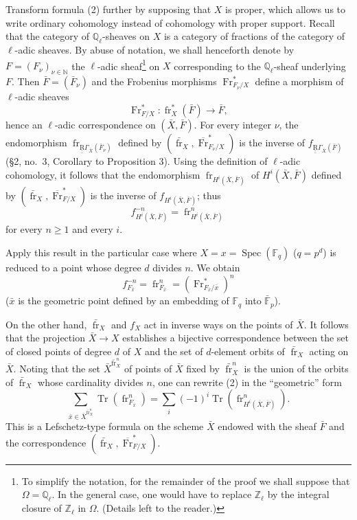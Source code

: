 \documentclass[11pt]{article}
\DeclareMathOperator{\Spec}{Spec}
\providecommand{\Tr}{\operatorname{Tr}}
\providecommand{\Tr}{\operatorname{Tr}}
\providecommand{\Tr}{\operatorname{Tr}}
\providecommand{\Tr}{\operatorname{Tr}}
\providecommand{\Spec}{\operatorname{Spec}}
\providecommand{\Spec}{\operatorname{Spec}}
\providecommand{\Spec}{\operatorname{Spec}}
\providecommand{\Tr}{\operatorname{Tr}}
\providecommand{\fr}{\operatorname{fr}}
\providecommand{\Fr}{\operatorname{Fr}}
\providecommand{\Fr}{\operatorname{Fr}}
\providecommand{\fr}{\operatorname{fr}}
\providecommand{\Spec}{\operatorname{Spec}}
\begin{document}
Transform formula (2) further by supposing that $X$ is proper, which
allows us to write ordinary cohomology instead of cohomology with
proper support. Recall that the category of $\mathbb Q_\ell$-sheaves
on $X$ is a category of fractions of the category of $\ell$-adic
sheaves. By abuse of notation, we shall henceforth denote by
$F=(F_\nu)_{\nu\in\mathbb N}$ the $\ell$-adic
sheaf\footnote{To simplify the notation, for the remainder of the
proof we shall suppose that $\Omega=\mathbb Q_\ell$. In the general
case, one would have to replace $\mathbb Z_\ell$ by the integral closure
of $\mathbb Z_\ell$ in $\Omega$. (Details left to the reader.)}
on $X$ corresponding to the $\mathbb Q_\ell$-sheaf underlying $F$.
Then $\bar F=(\bar F_\nu)$ and the Frobenius morphisms
$\Fr^*_{F_\nu/X}$ define a morphism of $\ell$-adic sheaves
\[
\Fr^*_{F/X}:
\fr_X^*(\bar F)\longrightarrow\bar F,
\]
hence an $\ell$-adic correspondence on $(\bar X,\bar F)$. For every
integer $\nu$, the endomorphism
$\fr_{\underline{\underline{\mathrm{R}}}\Gamma_{\bar X}(\bar F_\nu)}$ defined by
$(\bar{\fr}_X,\overline{\Fr}^*_{F_\nu/X})$ is the inverse of
$f_{\underline{\underline{\mathrm{R}}}\Gamma_{\bar X}(\bar F)}$ (§2, no.~3, Corollary to Proposition 3).
Using the definition of $\ell$-adic cohomology, it follows that the
endomorphism $\fr_{H^i(\bar X,\bar F)}$ of $H^i(\bar X,\bar F)$
defined by $(\bar{\fr}_X,\overline{\Fr}^*_{F/X})$ is the inverse of
$f_{H^i(\bar X,\bar F)}$; thus
\[
f^{-n}_{H^i(\bar X,\bar F)}
=\fr^n_{H^i(\bar X,\bar F)}
\]
for every $n\ge1$ and every $i$.

Apply this result in the particular case where $X=x=\Spec(\mathbb F_q)$ ($q=p^d$) is reduced to a point whose degree $d$ divides $n$. We obtain
\[
f^{-n}_{F_{\bar x}}=\fr^n_{F_{\bar x}}=(\Fr^*_{F_{\bar x}/\bar x})^n
\]
($\bar x$ is the geometric point defined by an embedding of $\mathbb F_q$ into $\bar{\mathbb F}_p$).

On the other hand, $\bar{\fr}_X$ and $f_X$ act in inverse ways on the points of $\bar X$. It follows that the projection $\bar X\to X$ establishes a bijective correspondence between the set of closed points of degree $d$ of $X$ and the set of $d$-element orbits of $\bar{\fr}_X$ acting on $\bar X$. Noting that the set $\bar X^{\bar{\fr}_X^n}$ of points of $\bar X$ fixed by $\bar{\fr}_X^n$ is the union of the orbits of $\bar{\fr}_X$ whose cardinality divides $n$, one can rewrite (2) in the ``geometric'' form
\[
\sum_{\bar x\in\bar X^{\bar{\fr}_X^n}}\Tr(\fr^n_{F_{\bar x}})
=\sum_i(-1)^i\Tr(\fr^n_{H^i(\bar X,\bar F)}).
\tag{2'}
\]
This is a Lefschetz-type formula on the scheme $\bar X$ endowed with the sheaf $\bar F$ and the correspondence $(\bar{\fr}_X,\overline{\Fr}^*_{F/X})$.
\end{document}
